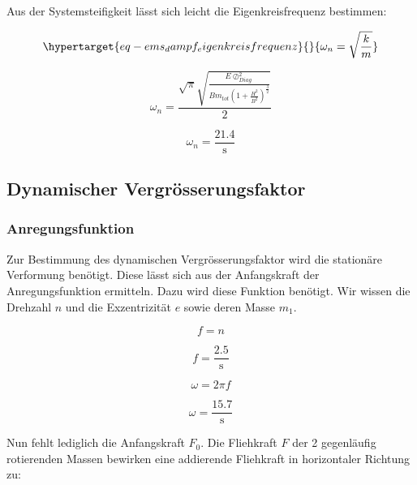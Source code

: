 \documentclass[
  letterpaper,
  DIV=11]{scrreprt}
\begin{document}
Aus der Systemsteifigkeit lässt sich leicht die Eigenkreisfrequenz
bestimmen:

\begin{equation}\protect\hypertarget{eq-ems_dampf_eigenkreisfrequenz}{}{
\omega_n =\sqrt{\frac{k}{m}}
}\label{eq-ems_dampf_eigenkreisfrequenz}\end{equation}

\begin{equation}\omega_{n} = \frac{\sqrt{\pi} \sqrt{\frac{E \oslash_{Diag}^{2}}{B m_{tot} \left(1 + \frac{H^{2}}{B^{2}}\right)^{\frac{3}{2}}}}}{2}\end{equation}

\begin{equation}\omega_{n} = \frac{21.4}{\text{s}}\end{equation}

\hypertarget{dynamischer-vergruxf6sserungsfaktor-1}{%
\subsection{Dynamischer
Vergrösserungsfaktor}\label{dynamischer-vergruxf6sserungsfaktor-1}}

\hypertarget{anregungsfunktion-1}{%
\subsubsection{Anregungsfunktion}\label{anregungsfunktion-1}}

Zur Bestimmung des dynamischen Vergrösserungsfaktor wird die stationäre
Verformung benötigt. Diese lässt sich aus der Anfangskraft der
Anregungsfunktion ermitteln. Dazu wird diese Funktion benötigt. Wir
wissen die Drehzahl \(n\) und die Exzentrizität \(e\) sowie deren Masse
\(m_1\).

\begin{equation}f = n\end{equation}

\begin{equation}f = \frac{2.5}{\text{s}}\end{equation}

\begin{equation}\omega = 2 \pi f\end{equation}

\begin{equation}\omega = \frac{15.7}{\text{s}}\end{equation}

Nun fehlt lediglich die Anfangskraft \(F_0\). Die Fliehkraft \(F\) der 2
gegenläufig rotierenden Massen bewirken eine addierende Fliehkraft in
horizontaler Richtung zu:
\end{document}
